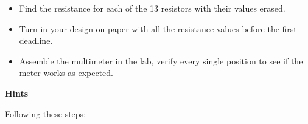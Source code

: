 \begin{itemize}

  \item Find the resistance for each of the 13 resistors with their values 
    erased.

  \item Turn in your design on paper with all the resistance values before
    the first deadline. 

  \item Assemble the multimeter in the lab, verify every single position 
    to see if the meter works as expected.
    
\end{itemize}

{\bf Hints} 

Following these steps:

